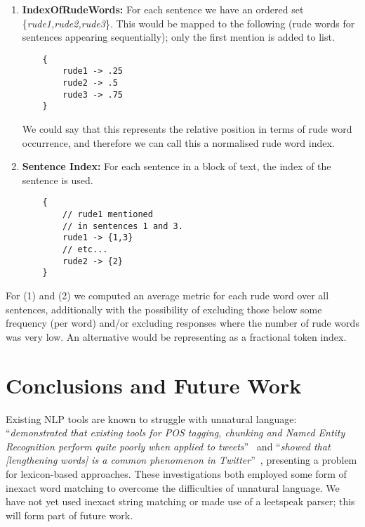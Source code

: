 \documentclass[letterpaper]{article}
\begin{document}
\begin{enumerate}
\item {\textbf{IndexOfRudeWords:}} For each sentence we have an
  ordered set \{{\emph{rude1,rude2,rude3}}\}. This would be mapped to
  the following (rude words for sentences appearing sequentially);
  only the first mention is added to list.\\

\begin{verbatim}
    {
        rude1 -> .25
        rude2 -> .5
        rude3 -> .75
    }

\end{verbatim}

We could say that this represents the relative position in terms of rude word occurrence, and therefore we can call this a normalised rude word index.\newline

\item {\textbf{Sentence Index:}} For each sentence in a block of text, the index of
the sentence is used.\\

\begin{verbatim}
    {
        // rude1 mentioned 
        // in sentences 1 and 3.
        rude1 -> {1,3}   
        // etc...
        rude2 -> {2}
    }

\end{verbatim}
\end{enumerate}

For (1) and (2) we computed an average metric for each rude word
over all sentences, additionally with the possibility of excluding
those below some frequency (per word) and/or excluding responses where
the number of rude words was very low. An alternative would be
representing as a fractional token index.


\section{Conclusions and Future Work}

Existing NLP tools are known to struggle with unnatural language:
``{\emph{demonstrated that existing tools for POS tagging, chunking
and Named Entity Recognition perform quite poorly when applied to
tweets}}''~\cite{ritter-et-al:2011} and ``{\emph{showed that
[lengthening words] is a common phenomenon in
Twitter}}''~\cite{brody+diakopoulos:2011}, presenting a problem for
lexicon-based approaches. These investigations both employed some form
of inexact word matching to overcome the difficulties of unnatural
language. We have not yet used inexact string matching or made use of
a leetspeak parser; this will form part of future work.
\end{document}
